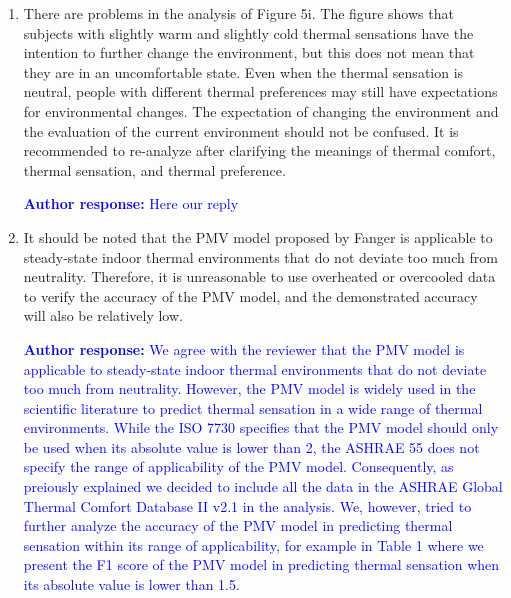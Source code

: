 \documentclass[a4paper, 10pt]{letter}
\newcommand{\response}[1]{\textcolor{blue}{\textbf{Author response:} #1}}
\begin{document}
\begin{letter}
\begin{enumerate}
            \response{
                Thank you for pointing this out.
                We made a mistake in the body manuscript and we should have written that the ``thermal sensation was measured with \sout{at least} a seven-point scale''.
                The peer-reviewed paper which describe the ASHRAE Global Thermal Comfort Database II v2.1 states that the thermal sensation votes were collected using a seven-point scale and coded as follows ``-3 cold, -2 cool, -1 slightly cool, 0 neutral, +1 slightly warm, +2 warm, +3 hot''.
                We have corrected this mistake in the manuscript.
            }

            \item There are problems in the analysis of Figure 5i.
            The figure shows that subjects with slightly warm and slightly cold thermal sensations have the intention to further change the environment, but this does not mean that they are in an uncomfortable state.
            Even when the thermal sensation is neutral, people with different thermal preferences may still have expectations for environmental changes.
            The expectation of changing the environment and the evaluation of the current environment should not be confused.
            It is recommended to re-analyze after clarifying the meanings of thermal comfort, thermal sensation, and thermal preference.

            \response{Here our reply}

            \item It should be noted that the PMV model proposed by Fanger is applicable to steady-state indoor thermal environments that do not deviate too much from neutrality.
            Therefore, it is unreasonable to use overheated or overcooled data to verify the accuracy of the PMV model, and the demonstrated accuracy will also be relatively low.

            \response{
                We agree with the reviewer that the PMV model is applicable to steady-state indoor thermal environments that do not deviate too much from neutrality.
                However, the PMV model is widely used in the scientific literature to predict thermal sensation in a wide range of thermal environments.
                While the ISO 7730 specifies that the PMV model should only be used when its absolute value is lower than 2, the ASHRAE 55 does not specify the range of applicability of the PMV model.
                Consequently, as preiously explained we decided to include all the data in the ASHRAE Global Thermal Comfort Database II v2.1 in the analysis.
                We, however, tried to further analyze the accuracy of the PMV model in predicting thermal sensation within its range of applicability, for example in Table 1 where we present the F1 score of the PMV model in predicting thermal sensation when its absolute value is lower than 1.5.
            }


\end{enumerate}
\end{letter}
\end{document}
